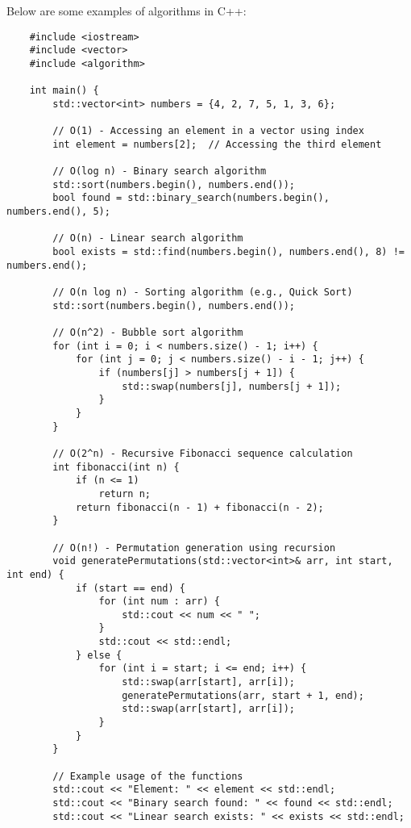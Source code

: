 \begin{solution}
    Below are some examples of algorithms in C++: \\
    \horizontalline
    \begin{verbatim}
    #include <iostream>
    #include <vector>
    #include <algorithm>

    int main() {
        std::vector<int> numbers = {4, 2, 7, 5, 1, 3, 6};

        // O(1) - Accessing an element in a vector using index
        int element = numbers[2];  // Accessing the third element

        // O(log n) - Binary search algorithm
        std::sort(numbers.begin(), numbers.end());
        bool found = std::binary_search(numbers.begin(), numbers.end(), 5);

        // O(n) - Linear search algorithm
        bool exists = std::find(numbers.begin(), numbers.end(), 8) != numbers.end();

        // O(n log n) - Sorting algorithm (e.g., Quick Sort)
        std::sort(numbers.begin(), numbers.end());

        // O(n^2) - Bubble sort algorithm
        for (int i = 0; i < numbers.size() - 1; i++) {
            for (int j = 0; j < numbers.size() - i - 1; j++) {
                if (numbers[j] > numbers[j + 1]) {
                    std::swap(numbers[j], numbers[j + 1]);
                }
            }
        }

        // O(2^n) - Recursive Fibonacci sequence calculation
        int fibonacci(int n) {
            if (n <= 1)
                return n;
            return fibonacci(n - 1) + fibonacci(n - 2);
        }

        // O(n!) - Permutation generation using recursion
        void generatePermutations(std::vector<int>& arr, int start, int end) {
            if (start == end) {
                for (int num : arr) {
                    std::cout << num << " ";
                }
                std::cout << std::endl;
            } else {
                for (int i = start; i <= end; i++) {
                    std::swap(arr[start], arr[i]);
                    generatePermutations(arr, start + 1, end);
                    std::swap(arr[start], arr[i]);
                }
            }
        }

        // Example usage of the functions
        std::cout << "Element: " << element << std::endl;
        std::cout << "Binary search found: " << found << std::endl;
        std::cout << "Linear search exists: " << exists << std::endl;


\end{verbatim}
\end{solution}
